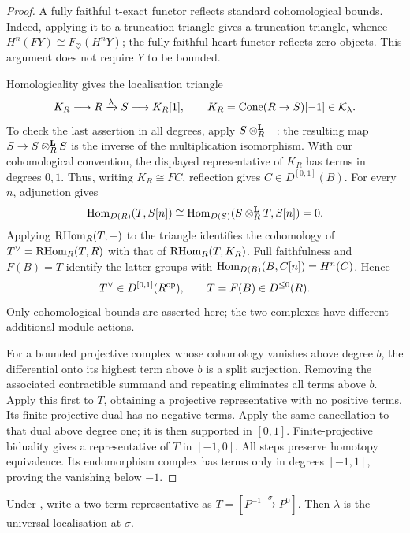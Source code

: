 \begin{proof}
A fully faithful t-exact functor reflects standard cohomological bounds.  Indeed, applying it to a truncation triangle gives a truncation triangle, whence
\(H^n(FY)\cong F_{\heartsuit}(H^nY)\); the fully faithful heart functor reflects zero objects.  This argument does not require \(Y\) to be bounded.

Homologicality gives the localisation triangle
\[
 K_R\longrightarrow R\xrightarrow{\lambda}S\longrightarrow K_R[1],
 \qquad K_R=\operatorname{Cone}(R\to S)[-1]\in\mathcal K_\lambda.
\]
To check the last assertion in all degrees, apply \(S\otimes^{\mathbf L}_R-\): the resulting map \(S\to S\otimes^{\mathbf L}_RS\) is the inverse of the multiplication isomorphism.  With our cohomological convention, the displayed representative of \(K_R\) has terms in degrees \(0,1\).  Thus, writing \(K_R\cong FC\), reflection gives \(C\in D^{[0,1]}(B)\).  For every \(n\), adjunction gives
\[
 \operatorname{Hom}_{D(R)}(T,S[n])
 \cong\operatorname{Hom}_{D(S)}(S\otimes^{\mathbf L}_RT,S[n])=0.
\]
Applying \(\operatorname{RHom}_R(T,-)\) to the triangle identifies the cohomology of \(T^\vee=\operatorname{RHom}_R(T,R)\) with that of \(\operatorname{RHom}_R(T,K_R)\).  Full faithfulness and \(F(B)=T\) identify the latter groups with \(\operatorname{Hom}_{D(B)}(B,C[n])=H^n(C)\).  Hence
\[
 T^\vee\in D^{[0,1]}(R^{\mathrm{op}}),
 \qquad T=F(B)\in D^{\le0}(R).
\]
Only cohomological bounds are asserted here; the two complexes have different additional module actions.

For a bounded projective complex whose cohomology vanishes above degree \(b\), the differential onto its highest term above \(b\) is a split surjection.  Removing the associated contractible summand and repeating eliminates all terms above \(b\).  Apply this first to \(T\), obtaining a projective representative with no positive terms.  Its finite-projective dual has no negative terms.  Apply the same cancellation to that dual above degree one; it is then supported in \([0,1]\).  Finite-projective biduality gives a representative of \(T\) in \([-1,0]\).  All steps preserve homotopy equivalence.  Its endomorphism complex has terms only in degrees \([-1,1]\), proving the vanishing below \(-1\).
\end{proof}

\begin{corollary}\label{cor:texact-universal}
Under , write a two-term representative as \(T=[P^{-1}\xrightarrow{\sigma}P^0]\).  Then \(\lambda\) is the universal localisation at \(\sigma\).
\end{corollary}

